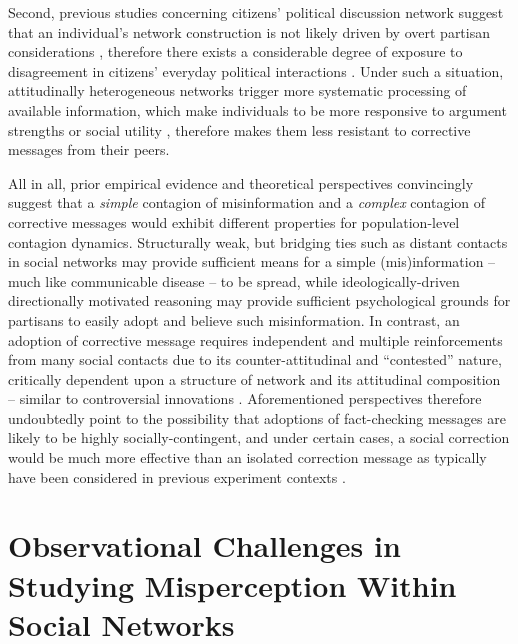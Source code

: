 \documentclass[man, 12pt, a4paper, noextraspace]{apa6}
\begin{document}
    Second, previous studies concerning citizens' political discussion network suggest that an individual's network construction is not likely driven by overt partisan considerations \parencite{song2015uncovering,lazer2010coevolution}, therefore there exists a considerable degree of exposure to disagreement in citizens' everyday political interactions \parencite[e.g.,][]{Bakshy1130, morey2012matters}. Under such a situation, attitudinally heterogeneous networks trigger more systematic processing of available information, which make individuals to be more responsive to argument strengths \parencite{levitan2008resistance} or social utility \parencite{messing2014selective}, therefore makes them less resistant to corrective messages from their peers.    

  All in all, prior empirical evidence and theoretical perspectives convincingly suggest that a \emph{simple} contagion of misinformation and a \emph{complex} contagion of corrective messages would exhibit different properties for population-level contagion dynamics. Structurally weak, but bridging ties such as distant contacts in social networks may provide sufficient means for a simple (mis)information -- much like communicable disease -- to be spread, while ideologically-driven directionally motivated reasoning may provide sufficient psychological grounds for partisans to easily adopt and believe such misinformation. In contrast, an adoption of corrective message requires independent and multiple reinforcements from many social contacts due to its counter-attitudinal and \enquote{contested} nature, critically dependent upon a structure of network and its attitudinal composition -- similar to controversial innovations \parencite{centola2007complex, Centola2010Sience, gonzalez2011dynamics}. Aforementioned perspectives therefore undoubtedly point to the possibility that adoptions of fact-checking messages are likely to be highly socially-contingent, and under certain cases, a social correction would be much more effective than an isolated correction message as typically have been considered in previous experiment contexts \parencite[e.g.,][]{nyhan2010corrections,garrett2013undermining}.
    

\section{Observational Challenges in Studying Misperception Within Social Networks}
\end{document}
